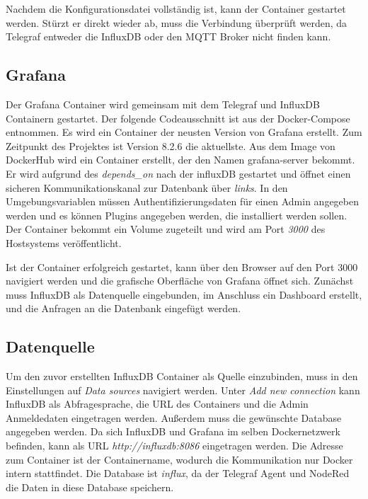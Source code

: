 \documentclass[a4paper, 12pt, oneside, toc=listofnumbered, bibliography=totoc]{scrbook}
\begin{document}
			
			
			Nachdem die Konfigurationsdatei vollständig ist, kann der Container gestartet werden. Stürzt er direkt wieder ab, muss die Verbindung überprüft werden, da Telegraf entweder die InfluxDB oder den MQTT Broker nicht finden kann.
		
		\subsection{Grafana}
		
		Der Grafana Container wird gemeinsam mit dem Telegraf und InfluxDB Containern gestartet. Der folgende Codeausschnitt ist aus der Docker-Compose entnommen. Es wird ein Container der neusten Version von Grafana erstellt. Zum Zeitpunkt des Projektes ist Version 8.2.6 die aktuellste. Aus dem Image von DockerHub wird ein Container erstellt, der den Namen grafana-server bekommt. Er wird aufgrund des \textit{depends\_on} nach der influxDB gestartet und öffnet einen sicheren Kommunikationskanal zur Datenbank über \textit{links}. In den Umgebungsvariablen müssen Authentifizierungsdaten für einen Admin angegeben werden und es können Plugins angegeben werden, die installiert werden sollen. Der Container bekommt ein Volume zugeteilt und wird am Port \textit{3000} des Hostsystems veröffentlicht. 
		
		
		
		Ist der Container erfolgreich gestartet, kann über den Browser auf den Port 3000 navigiert werden und die grafische Oberfläche von Grafana öffnet sich. Zunächst muss InfluxDB als Datenquelle eingebunden, im Anschluss ein Dashboard erstellt, und die Anfragen an die Datenbank eingefügt werden. 
		
		\subsection{Datenquelle}
		
		Um den zuvor erstellten InfluxDB Container als Quelle einzubinden, muss in den Einstellungen auf \textit{Data sources} navigiert werden. Unter \textit{Add new connection} kann InfluxDB als Abfragesprache, die URL des Containers und die Admin Anmeldedaten eingetragen werden. Außerdem muss die gewünschte Database angegeben werden. Da sich InfluxDB und Grafana im selben Dockernetzwerk befinden, kann als URL \textit{http://influxdb:8086} eingetragen werden. Die Adresse zum Container ist der Containername, wodurch die Kommunikation nur Docker intern stattfindet. Die Database ist \textit{influx}, da der Telegraf Agent und NodeRed die Daten in diese Database speichern.
		
\end{document}
